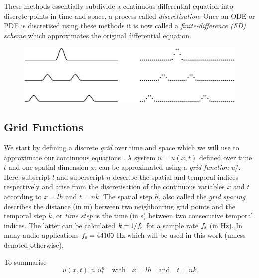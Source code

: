 
These methods essentially subdivide a continuous differential equation into discrete points in time and space, a process called \textit{discretisation}. Once an ODE or PDE is discretised using these methods it is now called a \textit{finite-difference (FD) scheme} which approximates the original differential equation. 

\begin{figure}[h]
    \centering
    \includegraphics[width=\textwidth]{figures/fdtd/gridFigure.eps}
    \caption{\label{fig:discretisation}  }
\end{figure}

\subsection{Grid Functions }
We start by defining a discrete \textit{grid} over time and space which we will use to approximate our continuous equations . A system $u = u(x,t)$ defined over time $t$ and one spatial dimension $x$, can be approximated using a \textit{grid function} $u_l^n$. Here, subscript $l$ and superscript $n$ describe the spatial and temporal indices respectively and arise from the discretisation of the continuous variables $x$ and $t$ according to $x=lh$ and $t=nk$. The spatial step $h$, also called the \textit{grid spacing} describes the distance (in m) between two neighbouring grid points and the temporal step $k$, or \textit{time step} is the time (in s) between two consecutive temporal indices. The latter can be calculated $k=1/f_\text{s}$ for a sample rate $f_\text{s}$ (in Hz). In many audio applications $f_\text{s} = 44100$ Hz which will be used in this work (unless denoted otherwise).

 To summarise
\begin{equation}
    u(x,t) \approx u_l^n \quad \text{with} \quad x=lh \quad \text{and} \quad t = nk
\end{equation}

